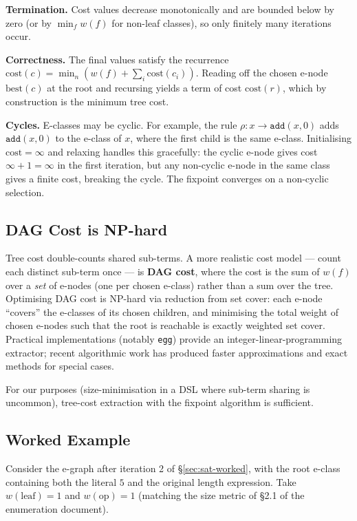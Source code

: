 \documentclass[11pt,a4paper]{article}
\begin{document}
\textbf{Termination.} Cost values decrease monotonically and are bounded below by zero (or by $\min_f w(f)$ for non-leaf classes), so only finitely many iterations occur.

\textbf{Correctness.} The final values satisfy the recurrence $\mathrm{cost}(c) = \min_n (w(f) + \sum_i \mathrm{cost}(c_i))$. Reading off the chosen e-node $\mathrm{best}(c)$ at the root and recursing yields a term of cost $\mathrm{cost}(r)$, which by construction is the minimum tree cost.

\textbf{Cycles.} E-classes may be cyclic. For example, the rule $\rho: x \to \mathtt{add}(x, 0)$ adds $\mathtt{add}(x, 0)$ to the e-class of $x$, where the first child is the same e-class. Initialising $\mathrm{cost} = \infty$ and relaxing handles this gracefully: the cyclic e-node gives cost $\infty + 1 = \infty$ in the first iteration, but any non-cyclic e-node in the same class gives a finite cost, breaking the cycle. The fixpoint converges on a non-cyclic selection.

\subsection{DAG Cost is NP-hard}\label{sec:extr-nphard}

Tree cost double-counts shared sub-terms. A more realistic cost model --- count each distinct sub-term once --- is \textbf{DAG cost}, where the cost is the sum of $w(f)$ over a \emph{set} of e-nodes (one per chosen e-class) rather than a sum over the tree. Optimising DAG cost is NP-hard via reduction from set cover: each e-node ``covers'' the e-classes of its chosen children, and minimising the total weight of chosen e-nodes such that the root is reachable is exactly weighted set cover. Practical implementations (notably \texttt{egg}) provide an integer-linear-programming extractor; recent algorithmic work has produced faster approximations and exact methods for special cases.

For our purposes (size-minimisation in a DSL where sub-term sharing is uncommon), tree-cost extraction with the fixpoint algorithm is sufficient.

\subsection{Worked Example}\label{sec:extr-worked}

Consider the e-graph after iteration 2 of §\ref{sec:sat-worked}, with the root e-class containing both the literal $5$ and the original length expression. Take $w(\text{leaf}) = 1$ and $w(\text{op}) = 1$ (matching the size metric of §2.1 of the enumeration document).
\end{document}
